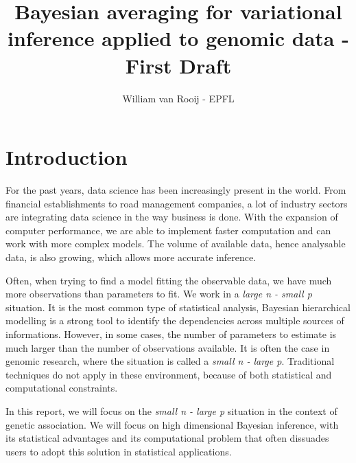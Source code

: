 \documentclass{article}
\numberwithin{equation}{section}
\begin{document}
\title{Bayesian averaging for variational inference applied to genomic data - First Draft}
\author{William van Rooij - EPFL}

\maketitle

\newpage
\tableofcontents
\newpage
\section{Introduction}
For the past years, data science has been increasingly present in the world. From financial establishments to road management companies, a lot of industry sectors are integrating data science in the way business is done. With the expansion of computer performance, we are able to implement faster computation and can work with more complex models. The volume of available data, hence analysable data, is also growing, which allows more accurate inference.

Often, when trying to find a model fitting the observable data, we have much more observations than parameters to fit. We work in a \textit{large n - small p} situation. It is the most common type of statistical analysis, Bayesian hierarchical modelling is a strong tool to identify the dependencies across multiple sources of informations. However, in some cases, the number of parameters to estimate is much larger than the number of observations available. It is often the case in genomic research, where the situation is called a \textit{small n - large p}. Traditional techniques do not apply in these environment, because of both statistical and computational constraints.

In this report, we will focus on the \textit{small n - large p} situation in the context of genetic association. We will focus on high dimensional Bayesian inference, with its statistical advantages and its computational problem that often dissuades users to adopt this solution in statistical applications.
\end{document}
